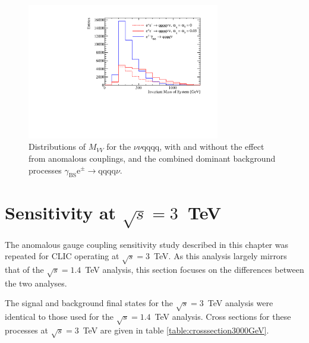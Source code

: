 \begin{figure}[h!]
\centering
\includegraphics[width=0.75\textwidth]{PhysicsAnalysis/Plots/NuisanceFit/1400GeV/NuisanceExplanation.pdf}
\caption[Distributions of $M_{VV}$ for the $\nu\nu\text{qqqq}$, with and without the effect from anomalous couplings, and the combined dominant background processes $\gamma_{\text{BS}}\text{e}^{\pm} \rightarrow \text{qqqq}\nu$.]{Distributions of $M_{VV}$ for the $\nu\nu\text{qqqq}$, with and without the effect from anomalous couplings, and the combined dominant background processes $\gamma_{\text{BS}}\text{e}^{\pm} \rightarrow \text{qqqq}\nu$.}
\label{fig:nuisanceexplanation1400GeV}
\end{figure}


\section{Sensitivity at $\sqrt{s}=3$~TeV}
The anomalous gauge coupling sensitivity study described in this chapter was repeated for CLIC operating at $\sqrt{s}=3$~TeV.  As this analysis largely mirrors that of the $\sqrt{s}=1.4$~TeV analysis, this section focuses on the differences between the two analyses.  

The signal and background final states for the $\sqrt{s}=3$~TeV analysis were identical to those used for the $\sqrt{s}=1.4$~TeV analysis.  Cross sections for these processes at $\sqrt{s}=3$~TeV are given in table \ref{table:crosssection3000GeV}.  

